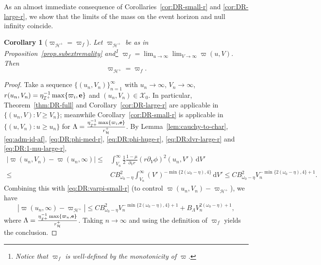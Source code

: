 \documentclass[10pt, reqno]{amsart}
\newtheorem{corollary}[theorem]{Corollary}
\theoremstyle{definition}
\theoremstyle{remark}
\theoremstyle{conjecture}
\numberwithin{equation}{section}
\newcommand{\ud}{\mathrm{d}}
\newcommand{\rd}{\partial}
\newcommand{\0}{\emptyset}
\newcommand{\omg}{\omega}
\newcommand{\bfe}{{\bf e}}
\newcommand{\calH}{\mathcal H}
\newcommand{\calI}{\mathcal I}
\newcommand{\calX}{\mathcal X}
\newcommand{\f}{\frac}
\newcommand{\EH}{\calH^{+}}
\newcommand{\e}{\bfe}							%
\newcommand{\NI}{\calI^{+}}						%
\begin{document}
As an almost immediate consequence of Corollaries~\ref{cor:DR-small-r} and \ref{cor:DR-large-r}, we show that the limits of the mass on the event horizon and null infinity coincide.
\begin{corollary}[$\varpi_{\EH}=\varpi_f$]\label{varpi.same.limit}
Let $\varpi_{\EH}$ be as in Proposition~\ref{prop.subextremality} and\footnote{Notice that $\varpi_f$ is well-defined by the monotonicity of $\varpi$.} $\varpi_f=\lim_{u\to \infty} \lim_{V\to\infty} \varpi(u,V)$. Then
$$\varpi_{\EH}=\varpi_f.$$
\end{corollary}
\begin{proof}
Take a sequence $\{(u_n, V_n)\}_{n=1}^\infty$ with $u_n \to \infty$, $V_n \to \infty$, $r(u_n, V_n)=\eta_{\NI}^{-1}\max\{\varpi_i,\e\}$ and $(u_n, V_n)\in \calX_{0}$. In particular, Theorem~\ref{thm:DR-full} and Corollary~\ref{cor:DR-large-r} are applicable in $\{(u_n, V):V\geq V_n \}$; meanwhile Corollary~\ref{cor:DR-small-r} is applicable in $\{(u,V_n): u\geq u_n \}$ for $\Lambda =\f{\eta_{\NI}^{-1}\max\{\varpi_i,\e\}}{r_\EH}$. By Lemma~\ref{lem:cauchy-to-char}, \eqref{eq:adm-id-af}, \eqref{eq:DR:phi-med-r}, \eqref{eq:DR:phi-huge-r}, \eqref{eq:DR:dvr-large-r} and \eqref{eq:DR:1-mu-large-r},
\begin{equation*}
\begin{split}
\left|\varpi(u_n,V_n)-\varpi(u_n,\infty)\right|\leq &\int_{V_n}^\infty \f 12 \f{1-\mu}{\rd_V r} (r\rd_V\phi)^2 (u_n, V')\, \ud V'\\
\leq &CB_{\omg_0-\eta}^2 \int_{V_n}^\infty(V')^{-\min\{2(\omg_0-\eta),4\}}\,\ud V'\leq CB_{\omg_0-\eta}^2 V_n^{-\min\{2(\omg_0-\eta),4\}+1}.
\end{split}
\end{equation*}
Combining this with \eqref{eq:DR:varpi-small-r} (to control $\varpi(u_n,V_n)-\varpi_{\EH}$), we have
$$\left|\varpi(u_n,\infty)-\varpi_{\EH}\right|\leq CB_{\omg_0-\eta}^2 V_{n}^{-\min\{2(\omg_0-\eta),4\}+1}+B_{\Lambda}V_{n}^{2(\omg_0-\eta)+1},$$
where $\Lambda =\f{\eta_{\NI}^{-1}\max\{\varpi_n,\e\}}{r_\EH}$. Taking $n \to \infty$ and using the definition of $\varpi_f$ yields the conclusion. \qedhere
\end{proof}
\end{document}
